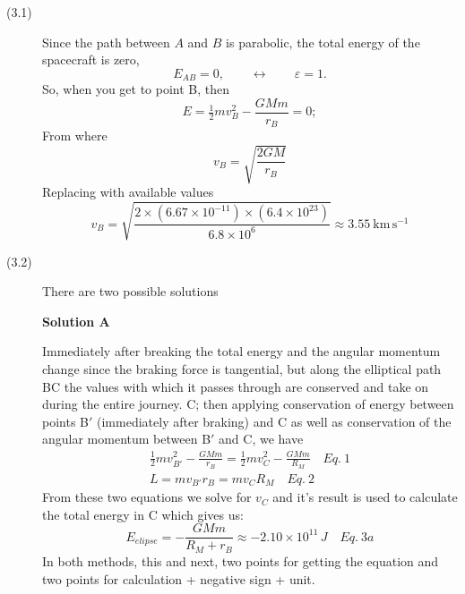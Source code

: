 \begin{description}
\item[(3.1)] Since the path between $A$ and $B$ is parabolic, the total
energy of the spacecraft is zero,
\[ E_{AB} = 0, \qquad \leftrightarrow \qquad \varepsilon = 1. \]
So, when you get to point B, then
\begin{equation*}
E = \tfrac{1}{2}mv_B^2 - \frac{GMm}{r_B} = 0; \tag*{[1 point]}
\end{equation*}
From where
\begin{equation*}
v_B = \sqrt{\frac{2GM}{r_B}} \tag*{[1 point]}
\end{equation*}
Replacing with available values
\begin{equation*}
v_B = \sqrt{\frac{2 \times (6.67 \times 10^{-11}) \times
  (6.4 \times 10^{23})}{6.8 \times 10^{6}}}
  \approx 3.55\ \mathrm{km\,s^{-1}} \tag*{[1 point]}
\end{equation*}

\item[(3.2)] There are two possible solutions

\textbf{Solution A}

Immediately after breaking %
the total energy and the angular momentum change since the braking force is
tangential, but along the elliptical path BC the values with which it passes
through are conserved and take on during the entire journey. C; then applying
conservation of energy between points B$'$ (immediately after braking) and C
as well as conservation of the angular momentum between B$'$ and C, we have
\begin{gather*}
\tfrac{1}{2}mv_{B'}^2 - \frac{GMm}{r_B}
  = \tfrac{1}{2}mv_C^2 - \frac{GMm}{R_M} \quad Eq.~1
  \tag*{[1 point]} \\
L = mv_{B'}r_B = mv_C R_M \quad Eq.~2 \tag*{[1 point]}
\end{gather*}
From these two equations we solve for $v_C$ and it's result is used to
calculate the total energy in C which gives us:
\begin{equation*}
E_{elipse} = -\frac{GMm}{R_M + r_B} \approx -2.10 \times 10^{11}\,J
  \quad Eq.~3a \tag*{[2 points]}
\end{equation*}
In both methods, this and next, two points for getting the equation and two
points for calculation + negative sign + unit.
\end{description}

